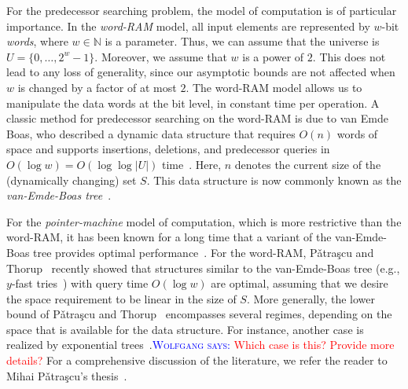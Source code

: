 \documentclass[a4paper,11pt]{article}
\newcommand{\N}{\mathbb{N}}
\newcommand{\?}{\mskip1.5mu}
\newcommand{\Patrascu}{P\v{a}tra\c{s}cu\xspace}
\newcommand{\aremark}[3]{\textcolor{blue}{\textsc{#1 #2:}}
  \textcolor{red}{\textsf{#3}}}
\newcommand{\wolfgang}[2][says]{\aremark{Wolfgang}{#1}{#2}}
\begin{document}
For the predecessor searching problem, the model 
of computation is of particular importance. In 
the \emph{word-RAM} model, all input elements 
are represented by $w$-bit \emph{words}, where 
$w \in \N$ is a parameter. Thus, we can assume 
that the universe is $U = \{0, \dots, 2^{w}-1\}$. 
Moreover, we assume that $w$ 
is a power of $2$. This does not lead to any 
loss of generality, since our asymptotic bounds 
are not affected when $w$ is changed by a factor of 
at most $2$. The word-RAM model allows us to 
manipulate the data words at the bit level, 
in constant time per operation. A classic 
method for predecessor searching on the 
word-RAM is due to van Emde Boas, who described 
a dynamic data structure that requires $O(n)$ words
of space and supports insertions, deletions, and 
predecessor queries in 
$O(\log w) = O(\log\log |U|)$ 
time~\cite{vEmdeBoas77,vEmdeBoasKaZi76,CormenLeRiSt09}.
Here, $n$ denotes the current size of the
(dynamically changing) set $S$. This data 
structure is now commonly known as the 
\emph{van-Emde-Boas tree}~\cite{CormenLeRiSt09}.

For the \emph{pointer-machine} model of computation, 
which is more restrictive than the word-RAM, it has 
been known for a long time that a variant of the 
van-Emde-Boas tree provides optimal 
performance~\cite{MehlhornNaAl88,Mulzer09}.
For the word-RAM, \Patrascu and Thorup~\cite{PatrascuTh06,PatrascuTh07} 
recently showed that structures similar to the 
van-Emde-Boas tree (e.g., $y$-fast tries~\cite{Willard83}) 
with query time $O(\log w)$ are optimal, assuming that 
we desire the space requirement to be linear in the 
size of $S$. More generally, the lower bound of 
\Patrascu and Thorup~\cite{PatrascuTh06,PatrascuTh07} 
encompasses several regimes, depending on the 
space that is available for the data structure.
For instance, another case is realized by exponential 
trees~\cite{AnderssonTh07}.\wolfgang{Which case is this?
Provide more details?} 
For a comprehensive discussion of the literature, we refer
the reader to Mihai \Patrascu's thesis~\cite{Patrascu08}.
\end{document}
